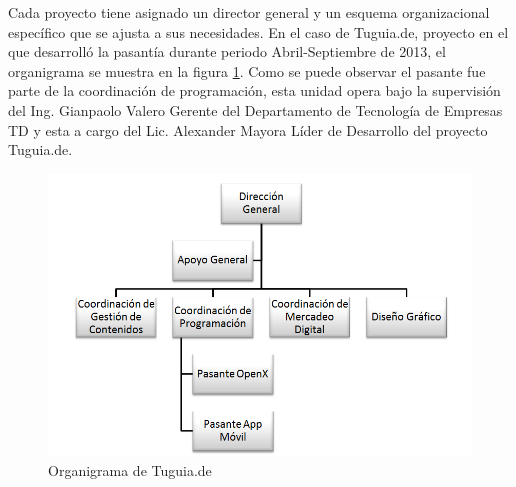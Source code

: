 Cada proyecto tiene asignado un director general y un esquema organizacional específico que se ajusta a sus necesidades. En el caso de Tuguia.de, proyecto en el que desarrolló la pasantía durante periodo Abril-Septiembre de 2013, el organigrama se muestra en la figura \ref{fig:ogtgd}. Como se puede observar el pasante fue parte de la coordinación de programación, esta unidad opera bajo la supervisión del Ing. Gianpaolo Valero Gerente del Departamento de Tecnología de Empresas TD y esta a cargo del Lic. Alexander Mayora Líder de Desarrollo del proyecto Tuguia.de.

\begin{figure}[h]
	\begin{center}
		\includegraphics[scale=0.4]{imagenes/OrganigramaTGD.png}
	\end{center}
	\caption{
		\label{fig:ogtgd}
		Organigrama de Tuguia.de
	}
\end{figure}
 